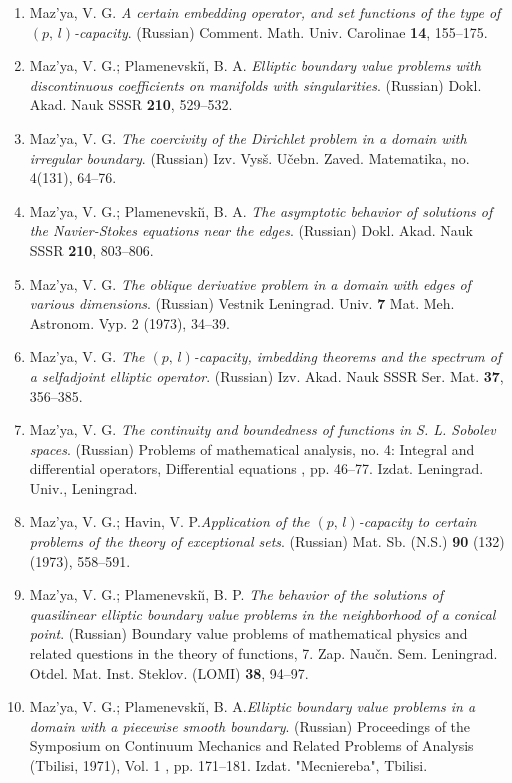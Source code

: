 \documentclass{article}
\begin{document}
\begin{enumerate}
{\bf 1973}
\item Maz'ya, V. G. {\it A certain embedding operator, and set
functions of
the type of $(p,\,l)$-capacity}.
(Russian) Comment. Math. Univ. Carolinae {\bf 14}, 155--175.
\item Maz'ya, V. G.; Plamenevski{\u\i}, B. A. {\it Elliptic boundary
value
problems with discontinuous
coefficients on manifolds with singularities}. (Russian) Dokl. Akad.
Nauk
SSSR {\bf 210}, 529--532.
\item Maz'ya, V. G. {\it The coercivity of the Dirichlet problem in a
domain with irregular boundary}.
(Russian) Izv. Vys\v s. U\v cebn.
Zaved. Matematika, no. 4(131), 64--76.
\item Maz'ya, V. G.; Plamenevski{\u\i}, B. A. {\it The asymptotic
behavior
of solutions of the Navier-Stokes equations near the
edges}. (Russian) Dokl. Akad. Nauk SSSR {\bf 210}, 803--806.
\item Maz'ya, V. G. {\it The oblique derivative problem in a domain
with
edges of various dimensions}.
(Russian) Vestnik Leningrad. Univ. {\bf 7} Mat. Meh. Astronom. Vyp. 2
(1973), 34--39.
\item Maz'ya, V. G. {\it The $(p,\,l)$-capacity, imbedding theorems
and the
spectrum of a selfadjoint
elliptic operator}. (Russian) Izv. Akad. Nauk SSSR Ser. Mat. {\bf 37},
356--385.
\item Maz'ya, V. G. {\it The continuity and boundedness of functions
in S.
L. Sobolev spaces}.
(Russian) Problems of mathematical analysis, no. 4: Integral and
differential operators, Differential equations , pp.
46--77. Izdat. Leningrad. Univ., Leningrad.
\item Maz'ya, V. G.; Havin, V. P.{\it  Application of the
$(p,\,l)$-capacity to certain problems of the
theory of exceptional sets}. (Russian) Mat. Sb. (N.S.) {\bf 90} (132)
(1973), 558--591.
\item Maz'ya, V. G.; Plamenevski{\u\i}, B. P. {\it The behavior of the
solutions of quasilinear elliptic boundary
value problems in the
neighborhood of a conical point}. (Russian) Boundary value problems of
mathematical physics and related questions in the theory of
functions, 7. Zap. Nau\v cn. Sem. Leningrad. Otdel. Mat. Inst.
Steklov.
(LOMI) {\bf 38}, 94--97.
\item Maz'ya, V. G.; Plamenevski{\u\i}, B. A.{\it  Elliptic boundary
value
problems in a domain with a piecewise smooth
boundary}. (Russian) Proceedings of the Symposium on Continuum
Mechanics
and Related Problems of Analysis (Tbilisi, 1971), Vol. 1
, pp. 171--181. Izdat. "Mecniereba", Tbilisi.

\end{enumerate}
\end{document}
